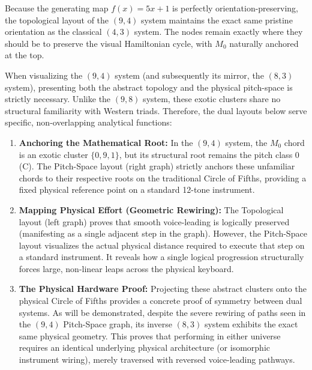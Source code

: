 \documentclass[11pt,letterpaper]{amsart}
\begin{document}
Because the generating map $f(x)=5x+1$ is perfectly orientation-preserving, the topological layout of the $(9,4)$ system maintains the exact same pristine orientation as the classical $(4,3)$ system. The nodes remain exactly where they should be to preserve the visual Hamiltonian cycle, with $M_0$ naturally anchored at the top. 

When visualizing the $(9,4)$ system (and subsequently its mirror, the $(8,3)$ system), presenting both the abstract topology and the physical pitch-space is strictly necessary. Unlike the $(9,8)$ system, these exotic clusters share no structural familiarity with Western triads. Therefore, the dual layouts below serve specific, non-overlapping analytical functions:

\begin{enumerate}
    \item \textbf{Anchoring the Mathematical Root:} In the $(9,4)$ system, the $M_0$ chord is an exotic cluster $\{0, 9, 1\}$, but its structural root remains the pitch class $0$ (C). The Pitch-Space layout (right graph) strictly anchors these unfamiliar chords to their respective roots on the traditional Circle of Fifths, providing a fixed physical reference point on a standard 12-tone instrument.
    \item \textbf{Mapping Physical Effort (Geometric Rewiring):} The Topological layout (left graph) proves that smooth voice-leading is logically preserved (manifesting as a single adjacent step in the graph). However, the Pitch-Space layout visualizes the actual physical distance required to execute that step on a standard instrument. It reveals how a single logical progression structurally forces large, non-linear leaps across the physical keyboard.
    \item \textbf{The Physical Hardware Proof:} Projecting these abstract clusters onto the physical Circle of Fifths provides a concrete proof of symmetry between dual systems. As will be demonstrated, despite the severe rewiring of paths seen in the $(9,4)$ Pitch-Space graph, its inverse $(8,3)$ system exhibits the exact same physical geometry. This proves that performing in either universe requires an identical underlying physical architecture (or isomorphic instrument wiring), merely traversed with reversed voice-leading pathways.
\end{enumerate}
\vspace{0.4cm}
\end{document}
